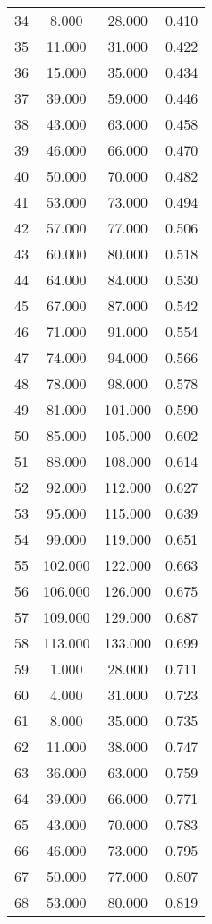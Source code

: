 \begin{tabular}{cccc}
  34 & 8.000 & 28.000 & 0.410 \\ 
  35 & 11.000 & 31.000 & 0.422 \\ 
  36 & 15.000 & 35.000 & 0.434 \\ 
  37 & 39.000 & 59.000 & 0.446 \\ 
  38 & 43.000 & 63.000 & 0.458 \\ 
  39 & 46.000 & 66.000 & 0.470 \\ 
  40 & 50.000 & 70.000 & 0.482 \\ 
  41 & 53.000 & 73.000 & 0.494 \\ 
  42 & 57.000 & 77.000 & 0.506 \\ 
  43 & 60.000 & 80.000 & 0.518 \\ 
  44 & 64.000 & 84.000 & 0.530 \\ 
  45 & 67.000 & 87.000 & 0.542 \\ 
  46 & 71.000 & 91.000 & 0.554 \\ 
  47 & 74.000 & 94.000 & 0.566 \\ 
  48 & 78.000 & 98.000 & 0.578 \\ 
  49 & 81.000 & 101.000 & 0.590 \\ 
  50 & 85.000 & 105.000 & 0.602 \\ 
  51 & 88.000 & 108.000 & 0.614 \\ 
  52 & 92.000 & 112.000 & 0.627 \\ 
  53 & 95.000 & 115.000 & 0.639 \\ 
  54 & 99.000 & 119.000 & 0.651 \\ 
  55 & 102.000 & 122.000 & 0.663 \\ 
  56 & 106.000 & 126.000 & 0.675 \\ 
  57 & 109.000 & 129.000 & 0.687 \\ 
  58 & 113.000 & 133.000 & 0.699 \\ 
  59 & 1.000 & 28.000 & 0.711 \\ 
  60 & 4.000 & 31.000 & 0.723 \\ 
  61 & 8.000 & 35.000 & 0.735 \\ 
  62 & 11.000 & 38.000 & 0.747 \\ 
  63 & 36.000 & 63.000 & 0.759 \\ 
  64 & 39.000 & 66.000 & 0.771 \\ 
  65 & 43.000 & 70.000 & 0.783 \\ 
  66 & 46.000 & 73.000 & 0.795 \\ 
  67 & 50.000 & 77.000 & 0.807 \\ 
  68 & 53.000 & 80.000 & 0.819 \\ 

\end{tabular}
